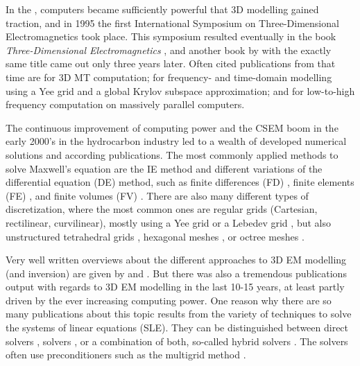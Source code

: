 \documentclass[extra, camera,%
]{gji}
\begin{document}
In the , computers became sufficiently powerful that 3D modelling gained traction, and in 1995 the first International Symposium on Three-Dimensional Electromagnetics took place. This symposium resulted eventually in the book \emph{Three-Dimensional Electromagnetics} \citep{B.SEG.99.Oristaglio}, and another book by \cite{B.02.Wannamaker} with the exactly same title came out only three years later. Often cited publications from that time are \cite{RSC.94.Mackie} for 3D MT computation; \cite{RS.94.Druskin} for frequency- and time-domain modelling using a Yee grid and a global Krylov subspace approximation; and \cite{RS.96.Alumbaugh, GJI.97.Newman} for low-to-high frequency computation on massively parallel computers.

The continuous improvement of computing power and the CSEM boom in the early 2000's in the hydrocarbon industry led to a wealth of developed numerical solutions and according publications. The most commonly applied methods to solve Maxwell's equation are the IE method \citep{GJI.74.Raiche, RS.02.Hursan, GEO.06.Zhdanov, GP.10.Tehrani, CAG.16.Kruglyakov, MGS.17.Kruglyakov} and different variations of the differential equation (DE) method, such as finite differences (FD) \citep{GEO.93.Wang, RS.94.Druskin, RSC.94.Mackie, GEO.09.Streich, CAG.13.Sommer}, finite elements (FE) \citep{GEO.04.Commer, GJI.11.Schwarzbach,GEO.12.daSilva, GJI.13.Grayver, GJI.13.Puzyrev, SEG.16.Zhang}, and finite volumes (FV) \citep{EM.90.Madsen, SIAM.01.Haber, PIER.01.Clemens, GEO.14.Jahandari}. There are also many different types of discretization, where the most common ones are regular grids (Cartesian, rectilinear, curvilinear), mostly using a Yee grid \citep{IEEE.66.Yee} or a Lebedev grid \citep{CMMP.64.Lebedev}, but also unstructured tetrahedral grids \citep{SEG.16.Zhang, CAG.17.Cai}, hexagonal meshes \citep{CAG.14.Cai}, or octree meshes \citep{ECP.07.Haber}.

Very well written overviews about the different approaches to 3D EM modelling (and inversion) are given by \cite{SG.05.Avdeev} and \cite{SG.10.Borner}. But there was also a tremendous publications output with regards to 3D EM modelling in the last 10-15 years, at least partly driven by the ever increasing computing power. One reason why there are so many publications about this topic results from the variety of techniques to solve the systems of linear equations (SLE). They can be distinguished between direct solvers \citep{GEO.09.Streich, GP.14.Chung, GEO.14.Jaysaval, GEO.15.Grayver, SEG.15.Oh, GJI.18.Wang},  solvers \citep{GP.06.Mulder, GJI.15.Jaysaval}, or a combination of both, so-called hybrid solvers \citep{GEO.18.Liu}. The solvers often use preconditioners such as the multigrid method \citep{SIAM.02.Aruliah, GJI.16.Jaysaval}.
\end{document}
